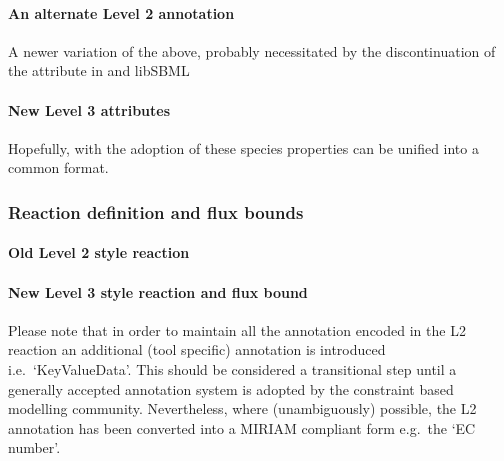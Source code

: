 \paragraph{An alternate \SBML Level 2 \Species annotation}
A newer variation of the above, probably necessitated by the discontinuation of the  attribute in \SBML and \textsf{libSBML}
%

\paragraph{New \SBML Level 3 \Species attributes}
Hopefully, with the adoption of \SBML \FBC these species properties can be unified into a common format.
%



\newpage
\subsubsection*{Reaction definition and flux bounds}
\paragraph{Old \SBML Level 2 style reaction}
\newpage
\paragraph{New \SBML Level 3 style reaction and flux bound}
Please note that in order to maintain all the annotation encoded in the \SBML L2 reaction  an additional (tool specific) annotation is introduced i.e.~`KeyValueData'. This should be considered a transitional step until a generally accepted annotation system is adopted by the constraint based modelling community. Nevertheless, where (unambiguously) possible, the L2 annotation has been converted into a MIRIAM compliant form e.g.~the `EC number'.


